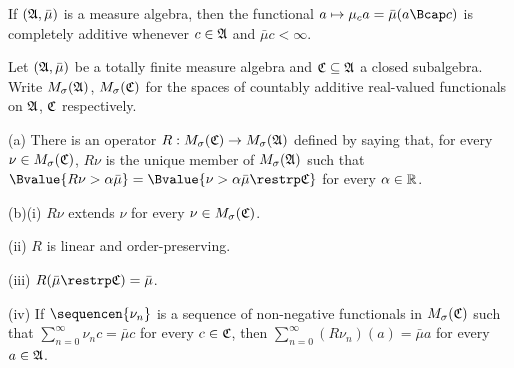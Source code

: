  If $(\frak A,\bar\mu)$ is a measure algebra,
then the functional $a\mapsto\mu_ca=\bar\mu(a\Bcap c)$ is
completely additive whenever $c\in\frak A$ and $\bar\mu c<\infty$.


 Let $(\frak A,\bar\mu)$ be a totally finite
measure algebra and $\frak C\subseteq\frak A$ a closed subalgebra.
Write $M_{\sigma}(\frak A)$, $M_{\sigma}(\frak C)$ for the spaces of
countably additive real-valued functionals on $\frak A$, $\frak C$
respectively.

(a) There is an operator $R:M_{\sigma}(\frak C)\to M_{\sigma}(\frak A)$
defined by saying that, for every $\nu\in M_{\sigma}(\frak C)$, $R\nu$
is the unique member of $M_{\sigma}(\frak A)$ such that
$\Bvalue{R\nu>\alpha\bar\mu}=\Bvalue{\nu>\alpha\bar\mu\restrp\frak C}$
for every $\alpha\in\Bbb R$.

(b)(i) $R\nu$ extends $\nu$ for every $\nu\in M_{\sigma}(\frak C)$.

\quad(ii) $R$ is linear and order-preserving.

\quad(iii) $R(\bar\mu\restrp\frak C)=\bar\mu$.

\quad(iv) If $\sequencen{\nu_n}$ is a sequence of non-negative
functionals in $M_{\sigma}(\frak C)$ such that
$\sum_{n=0}^{\infty}\nu_nc=\bar\mu c$ for every $c\in\frak C$, then
$\sum_{n=0}^{\infty}(R\nu_n)(a)=\bar\mu a$ for every $a\in\frak A$.


